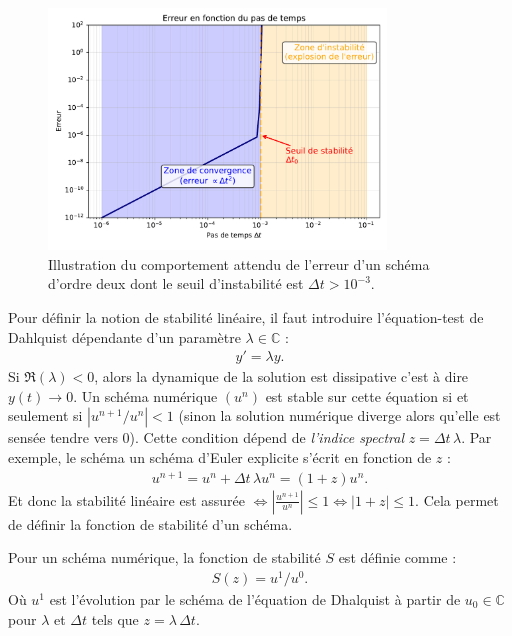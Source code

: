 \begin{figure}[htbp]
    \centering
    \includegraphics[width=0.8\textwidth]{media/3_/2_/exemple_satabilite.pdf}
    \caption{Illustration du comportement attendu de l'erreur d'un schéma d'ordre deux dont le seuil d'instabilité est $\Delta t > 10^{-3}$.}
    \label{fig:stabilite_schema}
\end{figure}
Pour définir la notion de stabilité linéaire, il faut introduire l'équation-test de Dahlquist dépendante d'un paramètre $\lambda \in \mathbb{C}$ :
\begin{align}y' = \lambda y.\end{align}
Si $\Re (\lambda) < 0$, alors la dynamique de la solution est dissipative c'est à dire $y(t) \rightarrow 0.$
Un schéma numérique $(u^n)$ est stable sur cette équation si et seulement si $\left\vert u^{n+1}/u^n\right\vert < 1$ (sinon la solution numérique diverge alors qu'elle est sensée tendre vers $0$).
Cette condition dépend de \emph{l'indice spectral} $z = \Delta t \, \lambda$. Par exemple, le schéma 
un schéma d'Euler explicite s'écrit en fonction de $z$ : 
\begin{align}
    u^{n+1} = u^n + \Delta t \, \lambda u^n = (1+z)u^n.
\end{align}
Et donc la stabilité linéaire est assurée $\iff \left\vert \frac{u^{n+1}}{u^n}\right\vert \leq 1 \iff \vert 1+z \vert \leq 1$. 
Cela permet de définir la fonction de stabilité d'un schéma.
\begin{definition}
    Pour un schéma numérique, la fonction de stabilité $S$ est définie comme :
    \begin{align}
        S(z) = u^1/u^0.
    \end{align}
    Où $u^1$ est l'évolution par le schéma de l'équation de Dhalquist à partir de $u_0 \in \mathbb{C}$ pour $\lambda$ et $\Delta t$ tels que $z = \lambda \, \Delta t$.
\end{definition}
